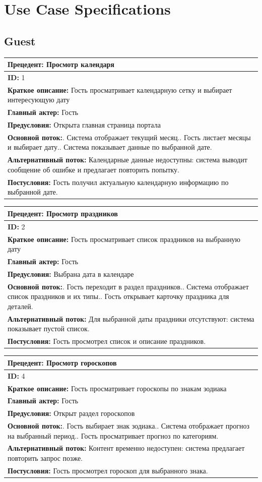 
\section{Use Case Specifications}

\newcommand{\UseCase}[8]{%
\begin{center}
\renewcommand{\arraystretch}{1.25}
\begin{tabular}{|p{0.95\textwidth}|}
\hline
\centering\textbf{Прецедент: #2} \tabularnewline
\hline
\textbf{ID:} #1 \tabularnewline
\hline
\textbf{Краткое описание:} #3 \tabularnewline
\hline
\textbf{Главный актер:} #4 \tabularnewline
\hline
\textbf{Предусловия:} #5 \tabularnewline
\hline
\textbf{Основной поток:}\newline #6 \tabularnewline
\hline
\textbf{Альтернативный поток:} #7 \tabularnewline
\hline
\textbf{Постусловия:} #8 \tabularnewline
\hline
\end{tabular}
\end{center}
\vspace{0.4cm}
}

\subsection{Guest}

\UseCase
{1}
{Просмотр календаря}
{Гость просматривает календарную сетку и выбирает интересующую дату}
{Гость}
{Открыта главная страница портала}
{1. Система отображает текущий месяц.\newline
2. Гость листает месяцы и выбирает дату.\newline
3. Система показывает данные по выбранной дате.}
{Календарные данные недоступны: система выводит сообщение об ошибке и предлагает повторить попытку.}
{Гость получил актуальную календарную информацию по выбранной дате.}

\UseCase
{2}
{Просмотр праздников}
{Гость просматривает список праздников на выбранную дату}
{Гость}
{Выбрана дата в календаре}
{1. Гость переходит в раздел праздников.\newline
2. Система отображает список праздников и их типы.\newline
3. Гость открывает карточку праздника для деталей.}
{Для выбранной даты праздники отсутствуют: система показывает пустой список.}
{Гость просмотрел список и описание праздников.}

\UseCase
{4}
{Просмотр гороскопов}
{Гость просматривает гороскопы по знакам зодиака}
{Гость}
{Открыт раздел гороскопов}
{1. Гость выбирает знак зодиака.\newline
2. Система отображает прогноз на выбранный период.\newline
3. Гость просматривает прогноз по категориям.}
{Контент временно недоступен: система предлагает повторить запрос позже.}
{Гость просмотрел гороскоп для выбранного знака.}

